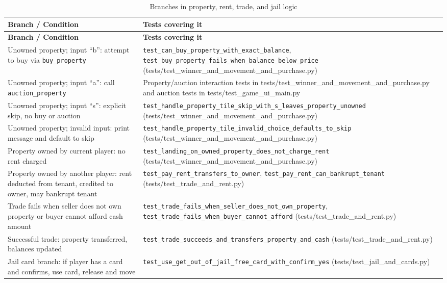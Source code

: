 \documentclass[11pt]{article}
\begin{document}
\begin{longtable}{>{\raggedright\arraybackslash}p{} >{\raggedright\arraybackslash}p{}}
\caption{Branches in property, rent, trade, and jail logic}\label{tab:game-jail}\\\hline
\textbf{Branch / Condition} & \textbf{Tests covering it} \\ \hline
\endfirsthead
\hline
\textbf{Branch / Condition} & \textbf{Tests covering it} \\ \hline
\endhead
Unowned property; input ``b'': attempt to buy via \texttt{buy\_property} & \texttt{test\_can\_buy\_property\_with\_exact\_balance}, \texttt{test\_buy\_property\_fails\_when\_balance\_below\_price} (tests/test\_winner\_and\_movement\_and\_purchase.py) \\ \hline
Unowned property; input ``a'': call \texttt{auction\_property} & Property/auction interaction tests in tests/test\_winner\_and\_movement\_and\_purchase.py and auction tests in tests/test\_game\_ui\_main.py \\ \hline
Unowned property; input ``s'': explicit skip, no buy or auction & \texttt{test\_handle\_property\_tile\_skip\_with\_s\_leaves\_property\_unowned} (tests/test\_winner\_and\_movement\_and\_purchase.py) \\ \hline
Unowned property; invalid input: print message and default to skip & \texttt{test\_handle\_property\_tile\_invalid\_choice\_defaults\_to\_skip} (tests/test\_winner\_and\_movement\_and\_purchase.py) \\ \hline
Property owned by current player: no rent charged & \texttt{test\_landing\_on\_owned\_property\_does\_not\_charge\_rent} (tests/test\_winner\_and\_movement\_and\_purchase.py) \\ \hline
Property owned by another player: rent deducted from tenant, credited to owner, may bankrupt tenant & \texttt{test\_pay\_rent\_transfers\_to\_owner}, \texttt{test\_pay\_rent\_can\_bankrupt\_tenant} (tests/test\_trade\_and\_rent.py) \\ \hline
Trade fails when seller does not own property or buyer cannot afford cash amount & \texttt{test\_trade\_fails\_when\_seller\_does\_not\_own\_property}, \texttt{test\_trade\_fails\_when\_buyer\_cannot\_afford} (tests/test\_trade\_and\_rent.py) \\ \hline
Successful trade: property transferred, balances updated & \texttt{test\_trade\_succeeds\_and\_transfers\_property\_and\_cash} (tests/test\_trade\_and\_rent.py) \\ \hline
Jail card branch: if player has a card and confirms, use card, release and move & \texttt{test\_use\_get\_out\_of\_jail\_free\_card\_with\_confirm\_yes} (tests/test\_jail\_and\_cards.py) \\ \hline

\end{longtable}
\end{document}
